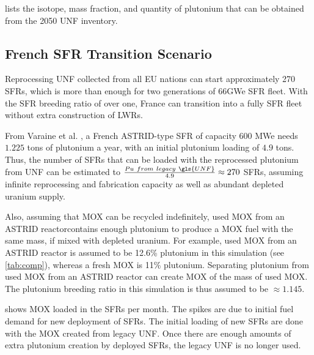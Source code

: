  lists the isotope, mass fraction,
and quantity of plutonium that can be obtained from the 2050 \gls{UNF} inventory.


\subsection{French \gls{SFR} Transition Scenario}

Reprocessing \gls{UNF} collected from all EU nations can start approximately
270 \glspl{SFR}, which is more than enough for two generations of 66GWe \gls{SFR}
fleet. With the \gls{SFR} breeding ratio of over one, France can transition into
a fully \gls{SFR} fleet without extra construction of \glspl{LWR}. 

From Varaine et al. \cite{marsaultmarie-sophie_pre-conceptual_2012}, a French
ASTRID-type \gls{SFR} of capacity 600 MWe needs $1.225$ tons of
plutonium a year, with an initial plutonium loading of $4.9$ tons. 
Thus, the number of \glspl{SFR} that can be loaded with the reprocessed
plutonium from \gls{UNF} can be estimated to $\frac{Pu \ from \ legacy \ \gls{UNF}}{4.9} \approx 270$ \glspl{SFR},
assuming infinite reprocessing and fabrication capacity as well as
abundant depleted uranium supply. 

Also, assuming that \gls{MOX} can be recycled indefinitely,
used \gls{MOX} from an ASTRID reactorcontains enough plutonium to produce a \gls{MOX} fuel with
the same mass, if mixed with depleted uranium. For example,
used \gls{MOX} from an ASTRID reactor is assumed to be 12.6\% plutonium
in this simulation (see \cref{tab:comp}), whereas a fresh \gls{MOX} is 11\% plutonium.
Separating plutonium from used \gls{MOX} from
an ASTRID reactor can create \gls{MOX} of the mass of used \gls{MOX}.
The plutonium breeding ratio in this simulation is thus assumed to be
$\approx 1.145$.

 shows \gls{MOX} loaded in the \glspl{SFR} per month.
The spikes are due to initial fuel demand for new deployment of \glspl{SFR}.
The initial loading of new \glspl{SFR} are done with the \gls{MOX} created
from legacy \gls{UNF}. Once there are enough amounts of extra plutonium creation
by deployed \glspl{SFR}, the legacy \gls{UNF} is no longer used. 

